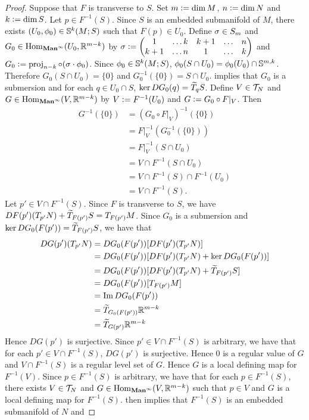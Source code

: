 \documentclass{book}
\begin{document}
	\begin{proof}
		Suppose that $F$ is transverse to $S$. Set $m \defeq \dim M$, $n \defeq \dim N$ and $k \defeq \dim S$. Let $p \in F^{-1}(S)$. Since $S$ is an embedded submanifold of $M$, there exists $(U_0, \phi_0) \in \S^k(M;S)$ such that $F(p) \in U_0$. Define $\sig \in S_m$ and $G_0 \in \Hom_{\Maninf}(U_0, \R^{m-k})$ by $\sig \defeq 
		\begin{pmatrix}
			1   & \ldots k & k+1 &  \ldots &  n \\
			k+1 & \ldots n & 1   &  \ldots &  k
		\end{pmatrix}$ 
		and $G_0 \defeq  \prj_{n-k} \circ (\sig \cdot \phi_0)$. Since $\phi_0 \in \S^k(M;S)$, $\phi_0(S \cap U_0) = \phi_0(U_0) \cap \S^{m,k}$. Therefore $G_0(S \cap U_0) = \{0\}$ and $G_0^{-1}(\{0\}) = S \cap U_0$.  implies that $G_0$ is a submersion and for each $q \in U_0 \cap S$, $\ker DG_0(q) = \wt{T}_qS$. Define $V \in \MT_N$ and $G \in \Hom_{\Maninf}(V, \R^{m-k})$ by $V \defeq F^{-1}(U_0)$ and $G \defeq G_0 \circ F|_{V}$. Then 
		\begin{align*}
			G^{-1}(\{0\})
			& = (G_0 \circ F|_{V})^{-1}(\{0\}) \\
			& = F|_{V}^{-1} (G_0^{-1}(\{0\})) \\
			& = F|_{V}^{-1}(S \cap U_0) \\
			& = V \cap F^{-1}(S \cap U_0) \\
			& = V \cap F^{-1}(S) \cap F^{-1}(U_0) \\
			& = V \cap F^{-1}(S). 
		\end{align*}
		Let $p' \in V \cap F^{-1}(S)$. Since $F$ is transverse to $S$, we have $DF(p')(T_{p'}N) + \wt{T}_{F(p')}S = T_{F(p')}M$. Since $G_0$ is a submersion and $\ker DG_0(F(p')) = \wt{T}_{F(p')}S$, we have that 
		\begin{align*}
			DG(p')(T_{p'}N)
			& = DG_0(F(p')) [ DF(p') (T_{p'} N)] \\
			& = DG_0(F(p')) [ DF(p')(T_{p'}N) + \ker DG_0(F(p')) ] \\
			& = DG_0(F(p')) [ DF(p')(T_{p'}N) + \wt{T}_{F(p')}S ] \\
			& = DG_0(F(p')) [ T_{F(p')} M ] \\
			& = \Im DG_0(F(p')) \\
			& = \wt{T}_{G_0(F(p'))} \R^{m-k} \\
			& = \wt{T}_{G(p')} \R^{m-k} 
		\end{align*}  
		Hence $DG(p')$ is surjective. Since $p' \in V \cap F^{-1}(S)$ is arbitrary, we have that for each $p' \in  V \cap F^{-1}(S)$, $DG(p')$ is surjective. Hence $0$ is a regular value of $G$ and $V \cap F^{-1}(S)$ is a regular level set of $G$. Hence $G$ is a local defining map for $F^{-1}(V)$. Since $p \in F^{-1}(S)$ is arbitrary, we have that for each $p \in F^{-1}(S)$, there exists $V \in \MT_N$ and $G \in \Hom_{\Maninf}(V, \R^{m-k})$ such that $p \in V$ and $G$ is a local defining map for $F^{-1}(S)$.  then implies that $F^{-1}(S)$ is an embedded submanifold of $N$ and

\end{proof}
\end{document}

